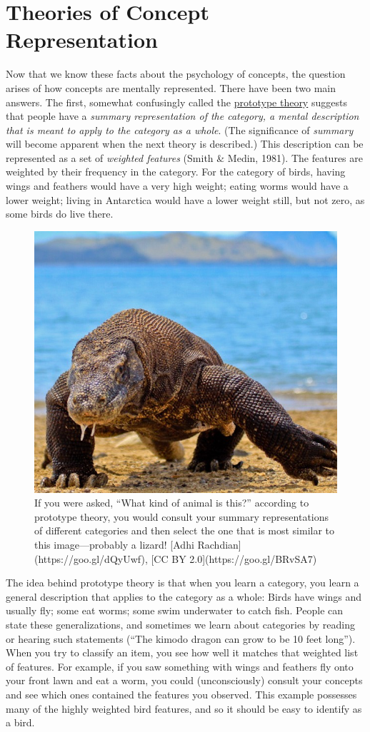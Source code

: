 \documentclass[
]{krantz}
\begin{document}
\section{Theories of Concept Representation}\label{theories-of-concept-representation}

Now that we know these facts about the psychology of concepts, the question arises of how concepts are mentally represented. There have been two main answers. The first, somewhat confusingly called the \hyperref[prototype-theory]{prototype theory} suggests that people have a \emph{summary representation of the category, a mental description that is meant to apply to the category as a whole}. (The significance of \emph{summary} will become apparent when the next theory is described.) This description can be represented as a set of \emph{weighted features} (Smith \& Medin, 1981). The features are weighted by their frequency in the category. For the category of birds, having wings and feathers would have a very high weight; eating worms would have a lower weight; living in Antarctica would have a lower weight still, but not zero, as some birds do live there.

\begin{figure}

{\centering \includegraphics[width=0.6\linewidth]{images/ch7/lizard} 

}

\caption{If you were asked, “What kind of animal is this?” according to prototype theory, you would consult your summary representations of different categories and then select the one that is most similar to this image—probably a lizard! [Adhi Rachdian](https://goo.gl/dQyUwf), [CC BY 2.0](https://goo.gl/BRvSA7)}\label{fig:lizard}
\end{figure}

The idea behind prototype theory is that when you learn a category, you learn a general description that applies to the category as a whole: Birds have wings and usually fly; some eat worms; some swim underwater to catch fish. People can state these generalizations, and sometimes we learn about categories by reading or hearing such statements (``The kimodo dragon can grow to be 10 feet long'').
When you try to classify an item, you see how well it matches that weighted list of features. For example, if you saw something with wings and feathers fly onto your front lawn and eat a worm, you could (unconsciously) consult your concepts and see which ones contained the features you observed. This example possesses many of the highly weighted bird features, and so it should be easy to identify as a bird.
\end{document}
